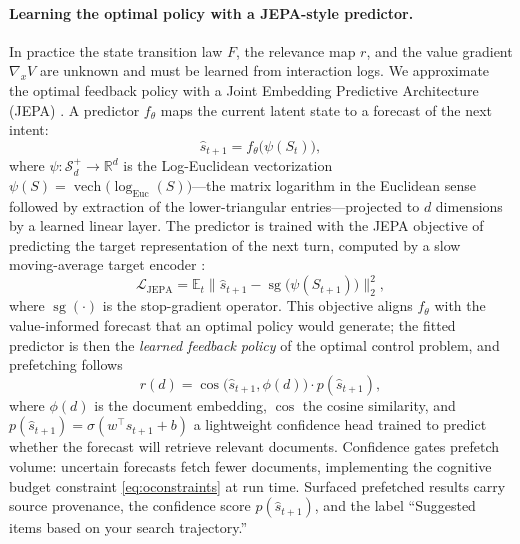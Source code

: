 \documentclass[11pt]{article}
\DeclareMathOperator{\vech}{vech}
\begin{document}
\paragraph{Learning the optimal policy with a JEPA-style predictor.} In practice the state transition law $F$, the relevance map $r$, and the value gradient $\nabla_x V$ are unknown and must be learned from interaction logs. We approximate the optimal feedback policy with a Joint Embedding Predictive Architecture (JEPA) \citep{lecun2022,assran2023_ijepa}. A predictor $f_\theta$ maps the current latent state to a forecast of the next intent:
\begin{equation}
\hat{s}_{t+1} = f_\theta\bigl(\psi(S_t)\bigr),
\label{eq:pred}
\end{equation}
where $\psi:\mathcal{S}_d^+\to\mathbb{R}^d$ is the Log-Euclidean vectorization $\psi(S)=\vech\bigl(\log_{\mathrm{Euc}}(S)\bigr)$---the matrix logarithm in the Euclidean sense followed by extraction of the lower-triangular entries---projected to $d$ dimensions by a learned linear layer. The predictor is trained with the JEPA objective of predicting the target representation of the next turn, computed by a slow moving-average target encoder \citep{assran2023_ijepa,grill20}:
\begin{equation}
\mathcal{L}_{\mathrm{JEPA}} = \mathbb{E}_t \bigl\| \hat{s}_{t+1} - \operatorname{sg}\bigl(\psi(S_{t+1})\bigr) \bigr\|_2^2,
\label{eq:jepa}
\end{equation}
where $\operatorname{sg}(\cdot)$ is the stop-gradient operator. This objective aligns $f_\theta$ with the value-informed forecast that an optimal policy would generate; the fitted predictor is then the \emph{learned feedback policy} of the optimal control problem, and prefetching follows
\begin{equation}
r(d) = \cos\bigl(\hat{s}_{t+1},\phi(d)\bigr) \cdot p(\hat{s}_{t+1}),
\label{eq:prefetch}
\end{equation}
where $\phi(d)$ is the document embedding, $\cos$ the cosine similarity, and $p(\hat{s}_{t+1})=\sigma(w^{\top}\hat{s}_{t+1}+b)$ a lightweight confidence head trained to predict whether the forecast will retrieve relevant documents. Confidence gates prefetch volume: uncertain forecasts fetch fewer documents, implementing the cognitive budget constraint \eqref{eq:oconstraints} at run time. Surfaced prefetched results carry source provenance, the confidence score $p(\hat{s}_{t+1})$, and the label ``Suggested items based on your search trajectory.''
\end{document}
